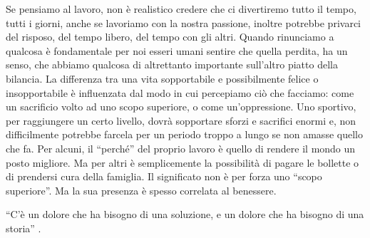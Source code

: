 \documentclass[12pt]{book} %
\begin{document}
Se pensiamo al lavoro, non è realistico credere che ci
divertiremo tutto il tempo, tutti i giorni, anche se lavoriamo con la nostra passione, inoltre potrebbe privarci del risposo, 
del tempo libero, del tempo con gli altri.
Quando rinunciamo a qualcosa è fondamentale per noi esseri umani sentire che quella perdita, ha un senso, che abbiamo
qualcosa di altrettanto importante sull'altro piatto della bilancia. La differenza tra una vita
sopportabile e possibilmente felice o insopportabile è influenzata dal modo in cui percepiamo ciò che facciamo: come un
sacrificio volto ad uno scopo superiore, o come un'oppressione. Uno sportivo, per raggiungere un
certo livello, dovrà sopportare sforzi e sacrifici enormi e, non difficilmente potrebbe farcela per un periodo troppo a lungo se non
amasse quello che fa. Per alcuni, il “perché” del proprio lavoro è quello di rendere il mondo un posto migliore. Ma per
altri è semplicemente la possibilità di pagare le bollette o di prendersi cura della famiglia. Il significato non è per
forza uno “scopo superiore”. Ma la sua presenza è spesso correlata al benessere. 

“C'è un dolore che ha bisogno di una soluzione, e un dolore che ha bisogno di una storia” .
\end{document}
